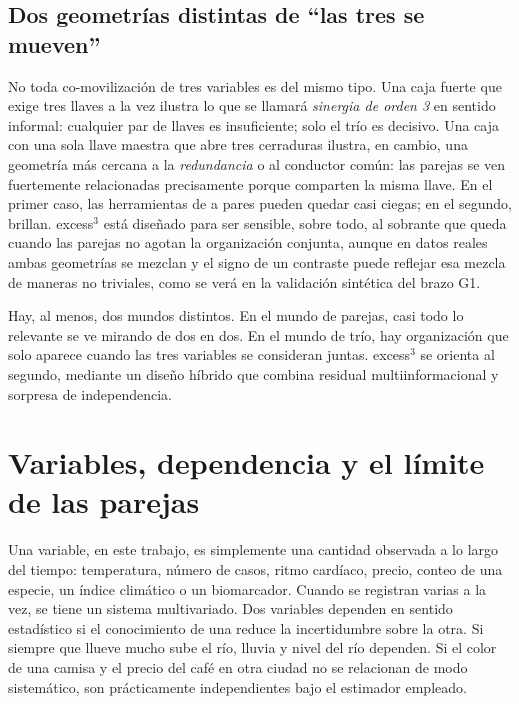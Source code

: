 \documentclass[11pt,a4paper]{article}
\begin{document}
\subsection{Dos geometr\'ias distintas de ``las tres se mueven''}

No toda co-movilizaci\'on de tres variables es del mismo tipo. Una caja
fuerte que exige tres llaves a la vez ilustra lo que se llamar\'a
\emph{sinergia de orden 3} en sentido informal: cualquier par de llaves es
insuficiente; solo el tr\'io es decisivo. Una caja con una sola llave maestra
que abre tres cerraduras ilustra, en cambio, una geometr\'ia m\'as cercana a
la \emph{redundancia} o al conductor com\'un: las parejas se ven
fuertemente relacionadas precisamente porque comparten la misma llave. En
el primer caso, las herramientas de a pares pueden quedar casi ciegas; en
el segundo, brillan. excess$^3$ est\'a dise\~nado para ser sensible, sobre
todo, al sobrante que queda cuando las parejas no agotan la organizaci\'on
conjunta, aunque en datos reales ambas geometr\'ias se mezclan y el signo
de un contraste puede reflejar esa mezcla de maneras no triviales, como se
ver\'a en la validaci\'on sint\'etica del brazo G1.

\begin{idea}
Hay, al menos, dos mundos distintos. En el mundo de parejas, casi todo lo
relevante se ve mirando de dos en dos. En el mundo de tr\'io, hay
organizaci\'on que solo aparece cuando las tres variables se consideran
juntas. excess$^3$ se orienta al segundo, mediante un dise\~no h\'ibrido que
combina residual multiinformacional y sorpresa de independencia.
\end{idea}

\section{Variables, dependencia y el l\'imite de las parejas}
\label{sec:cero}

Una variable, en este trabajo, es simplemente una cantidad observada a lo
largo del tiempo: temperatura, n\'umero de casos, ritmo card\'iaco, precio,
conteo de una especie, un \'indice clim\'atico o un biomarcador. Cuando se
registran varias a la vez, se tiene un sistema multivariado. Dos variables
dependen en sentido estad\'istico si el conocimiento de una reduce la
incertidumbre sobre la otra. Si siempre que llueve mucho sube el r\'io,
lluvia y nivel del r\'io dependen. Si el color de una camisa y el precio del
caf\'e en otra ciudad no se relacionan de modo sistem\'atico, son
pr\'acticamente independientes bajo el estimador empleado.
\end{document}
